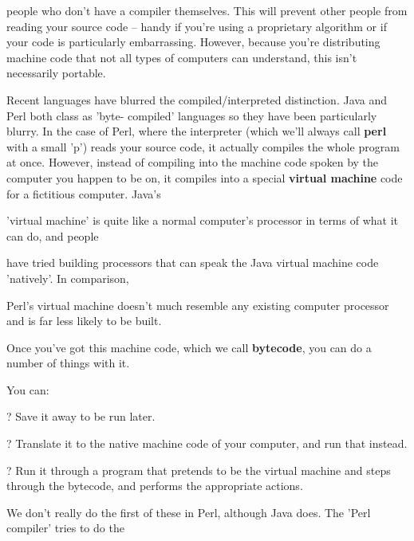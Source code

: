\documentclass[a4paper,11pt]{book}
\begin{document}
\noindent people who don't have a compiler themselves. This will prevent other people from reading your source code -- handy if you're using a proprietary algorithm or if your code is particularly embarrassing. However, because you're distributing machine code that not all types of computers can understand, this isn't necessarily portable.

\noindent 

\noindent Recent languages  have blurred  the  compiled/interpreted  distinction.  Java  and  Perl  both  class  as  'byte- compiled'  languages so they have  been  particularly  blurry.  In  the case  of  Perl,  where  the interpreter (which we'll always call \textbf{perl  }with  a  small  'p')  reads  your  source  code,  it  actually  compiles  the  whole program at once.  However,  instead  of compiling  into  the  machine  code  spoken  by  the computer  you happen  to  be on,  it compiles into  a  special  \textbf{virtual machine  }code  for  a  fictitious  computer.  Java's

\noindent 'virtual machine'  is quite  like  a  normal  computer's  processor  in  terms  of  what it  can do,  and  people

\noindent have tried building  processors  that  can  speak  the  Java  virtual  machine  code  'natively'.  In  comparison,

\noindent Perl's virtual  machine  doesn't  much  resemble  any  existing  computer  processor  and is  far less  likely  to be built.

\noindent 

\noindent Once  you've got this machine  code,  which  we  call  \textbf{bytecode},  you  can  do  a  number  of  things  with it.

\noindent You can:

\noindent 

\noindent ? Save it away to be run later.

\noindent 

\noindent ? Translate it to the native machine code of your computer, and run that instead.

\noindent 

\noindent ? Run it through a program that pretends to be the virtual machine and steps through the bytecode, and performs the appropriate actions.

\noindent 

\noindent We don't really do the first of these in Perl, although Java does. The 'Perl compiler' tries to do the
\end{document}
